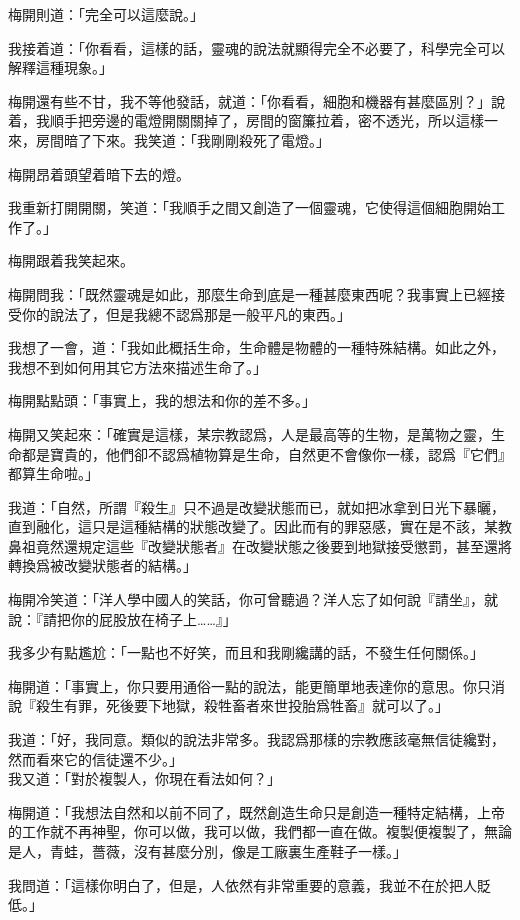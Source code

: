 梅開則道：「完全可以這麼說。」

我接着道：「你看看，這樣的話，靈魂的說法就顯得完全不必要了，科學完全可以解釋這種現象。」

梅開還有些不甘，我不等他發話，就道：「你看看，細胞和機器有甚麼區別？」說着，我順手把旁邊的電燈開關關掉了，房間的窗簾拉着，密不透光，所以這樣一來，房間暗了下來。我笑道：「我剛剛殺死了電燈。」

梅開昂着頭望着暗下去的燈。

我重新打開開關，笑道：「我順手之間又創造了一個靈魂，它使得這個細胞開始工作了。」

梅開跟着我笑起來。

梅開問我：「既然靈魂是如此，那麼生命到底是一種甚麼東西呢？我事實上已經接受你的說法了，但是我總不認爲那是一般平凡的東西。」

我想了一會，道：「我如此概括生命，生命體是物體的一種特殊結構。如此之外，我想不到如何用其它方法來描述生命了。」

梅開點點頭：「事實上，我的想法和你的差不多。」

梅開又笑起來：「確實是這樣，某宗教認爲，人是最高等的生物，是萬物之靈，生命都是寶貴的，他們卻不認爲植物算是生命，自然更不會像你一樣，認爲『它們』都算生命啦。」

我道：「自然，所謂『殺生』只不過是改變狀態而已，就如把冰拿到日光下暴曬，直到融化，這只是這種結構的狀態改變了。因此而有的罪惡感，實在是不該，某教鼻祖竟然還規定這些『改變狀態者』在改變狀態之後要到地獄接受懲罰，甚至還將轉換爲被改變狀態者的結構。」

梅開冷笑道：「洋人學中國人的笑話，你可曾聽過？洋人忘了如何說『請坐』，就說：『請把你的屁股放在椅子上……』」

我多少有點尷尬：「一點也不好笑，而且和我剛纔講的話，不發生任何關係。」


梅開道：「事實上，你只要用通俗一點的說法，能更簡單地表達你的意思。你只消說『殺生有罪，死後要下地獄，殺牲畜者來世投胎爲牲畜』就可以了。」

我道：「好，我同意。類似的說法非常多。我認爲那樣的宗教應該毫無信徒纔對，然而看來它的信徒還不少。」
\\


我又道：「對於複製人，你現在看法如何？」

梅開道：「我想法自然和以前不同了，既然創造生命只是創造一種特定結構，上帝的工作就不再神聖，你可以做，我可以做，我們都一直在做。複製便複製了，無論是人，青蛙，薔薇，沒有甚麼分別，像是工廠裏生產鞋子一樣。」

我問道：「這樣你明白了，但是，人依然有非常重要的意義，我並不在於把人貶低。」

